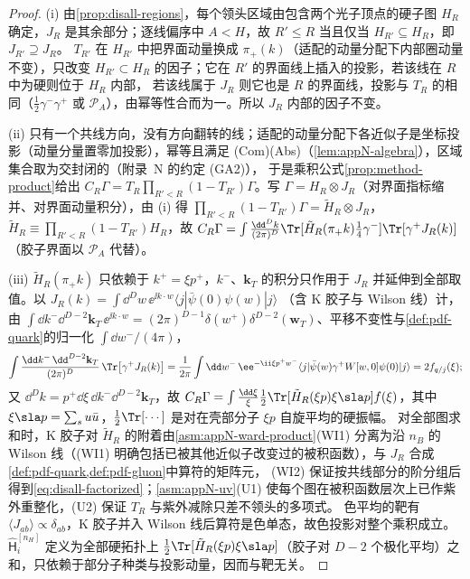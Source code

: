 \begin{proof}
(i) 由\cref{prop:disall-regions}，每个领头区域由包含两个光子顶点的硬子图 $H_R$ 确定，$J_R$ 是其余部分；逐线偏序中 $A<H$，故 $R'\le R$ 当且仅当 $H_{R'}\subseteq H_R$，即 $J_{R'}\supseteq J_R$。
$T_{R'}$ 在 $H_{R'}$ 中把界面动量换成 $\pi_+(k)$（适配的动量分配下内部圈动量不变），只改变 $H_{R'}\subset H_R$ 的因子；它在 $R'$ 的界面线上插入的投影，若该线在 $R$ 中为硬则位于 $H_R$ 内部，
若该线属于 $J_R$ 则它也是 $R$ 的界面线，投影与 $T_R$ 的相同（$\frac12\gamma^-\gamma^+$ 或 $\mathcal P_A$），由幂等性合而为一。所以 $J_R$ 内部的因子不变。

(ii) 只有一个共线方向，没有方向翻转的线；适配的动量分配下各近似子是坐标投影（动量分量置零加投影），幂等且满足 (Com)(Abs)（\cref{lem:appN-algebra}），区域集合取为交封闭的（附录~N 的约定 (GA2)），
于是乘积公式\cref{prop:method-product}给出 $C_R\Gamma=T_R\prod_{R'<R}(1-T_{R'})\Gamma$。写 $\Gamma=H_R\otimes J_R$（对界面指标缩并、对界面动量积分），由 (i) 得 $\prod_{R'<R}(1-T_{R'})\Gamma=\tilde H_R\otimes J_R$，
$\tilde H_R\equiv\prod_{R'<R}(1-T_{R'})H_R$，故 $C_R\Gamma=\int\frac{\dd^Dk}{(2\pi)^D}\Tr[\tilde H_R(\pi_+k)\frac14\gamma^-]\Tr[\gamma^+J_R(k)]$（胶子界面以 $\mathcal P_A$ 代替）。

(iii) $\tilde H_R(\pi_+k)$ 只依赖于 $k^+=\xi p^+$，$k^-$、$\mathbf k_T$ 的积分只作用于 $J_R$ 并延伸到全部取值。以 $J_R(k)=\int\dd^Dw\,\ee^{\ii k\cdot w}\langle j|\bar\psi(0)\psi(w)|j\rangle$
（含 K 胶子与 Wilson 线）计，由 $\int\dd k^-\dd^{D-2}\mathbf k_T\,\ee^{\ii k\cdot w}=(2\pi)^{D-1}\delta(w^+)\delta^{D-2}(\mathbf w_T)$、平移不变性与\cref{def:pdf-quark}的归一化 $\int\dd w^-/(4\pi)$，
\begin{equation}\label{eq:disall-chain}
\int\frac{\dd k^-\,\dd^{D-2}\mathbf k_T}{(2\pi)^D}\,\Tr\big[\gamma^+J_R(k)\big]=\frac1{2\pi}\int\dd w^-\,\ee^{-\ii\xi p^+w^-}\langle j|\bar\psi(w)\gamma^+W[w,0]\psi(0)|j\rangle=2f_{q/j}(\xi);
\end{equation}
又 $\dd^Dk=p^+\dd\xi\,\dd k^-\dd^{D-2}\mathbf k_T$，故 $C_R\Gamma=\int\frac{\dd\xi}{\xi}\frac12\Tr[\tilde H_R(\xi p)\xi\sla p]f(\xi)$，其中 $\xi\sla p=\sum_su\bar u$，$\frac12\Tr[\cdots]$ 是对在壳部分子 $\xi p$ 自旋平均的硬振幅。
对全部图求和时，K 胶子对 $\tilde H_R$ 的附着由\cref{asm:appN-ward-product}(WI1) 分离为沿 $n_B$ 的 Wilson 线（(WI1) 明确包括已被其他近似子改变过的被积函数），与 $J_R$ 合成\cref{def:pdf-quark,def:pdf-gluon}中算符的矩阵元，
(WI2) 保证按共线部分的阶分组后得到\cref{eq:disall-factorized}；\cref{asm:appN-uv}(U1) 使每个图在被积函数层次上已作紫外重整化，(U2) 保证 $T_R$ 与紫外减除只差不领头的多项式。
色平均的靶有 $\langle J_{ab}\rangle\propto\delta_{ab}$，K 胶子并入 Wilson 线后算符是色单态，故色投影对整个乘积成立。$\hat{\mathsf H}^{[n_H]}_i$ 定义为全部硬拓扑上 $\frac12\Tr[\tilde H_R(\xi p)\xi\sla p]$（胶子对 $D-2$ 个极化平均）之和，只依赖于部分子种类与投影动量，因而与靶无关。
\end{proof}

